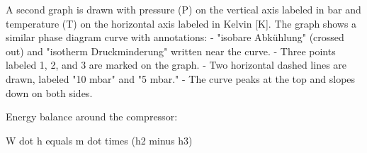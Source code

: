 A second graph is drawn with pressure (P) on the vertical axis labeled in bar and temperature (T) on the horizontal axis labeled in Kelvin [K]. The graph shows a similar phase diagram curve with annotations:  
- "isobare Abkühlung" (crossed out) and "isotherm Druckminderung" written near the curve.  
- Three points labeled 1, 2, and 3 are marked on the graph.  
- Two horizontal dashed lines are drawn, labeled "10 mbar" and "5 mbar."  
- The curve peaks at the top and slopes down on both sides.

Energy balance around the compressor:  

W dot h equals m dot times (h2 minus h3)